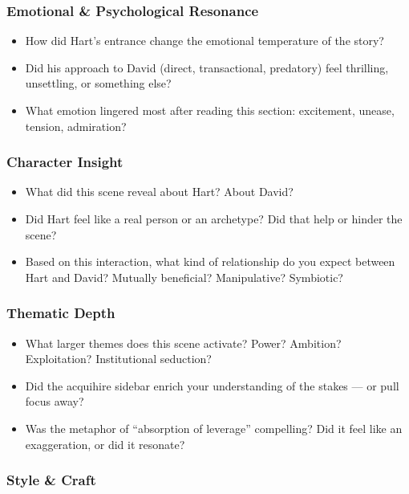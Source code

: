 \subsubsection{Emotional \& Psychological Resonance}

\begin{itemize}
  \item How did Hart’s entrance change the emotional temperature of the story?
  \item Did his approach to David (direct, transactional, predatory) feel thrilling, unsettling, or something else?
  \item What emotion lingered most after reading this section: excitement, unease, tension, admiration?
\end{itemize}

\subsubsection{Character Insight}

\begin{itemize}
  \item What did this scene reveal about Hart? About David?
  \item Did Hart feel like a real person or an archetype? Did that help or hinder the scene?
  \item Based on this interaction, what kind of relationship do you expect between Hart and David? Mutually beneficial? Manipulative? Symbiotic?
\end{itemize}

\subsubsection{Thematic Depth}

\begin{itemize}
  \item What larger themes does this scene activate? Power? Ambition? Exploitation? Institutional seduction?
  \item Did the acquihire sidebar enrich your understanding of the stakes — or pull focus away?
  \item Was the metaphor of “absorption of leverage” compelling? Did it feel like an exaggeration, or did it resonate?
\end{itemize}

\subsubsection{Style \& Craft}

